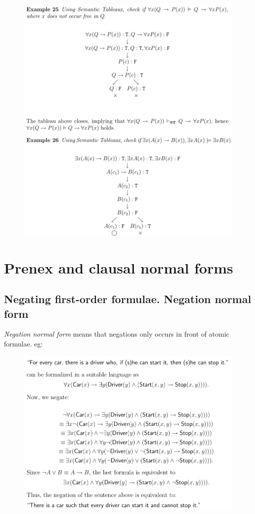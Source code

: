 \documentclass[10pt,a4paper]{article}
\begin{document}
\begin{figure}[H]
\includegraphics[scale=0.6]{./figures/tableaux.pdf}
\end{figure}

\section{Prenex and clausal normal forms}
\subsection{Negating first-order formulae. Negation normal form}

\textit{Negation normal form}\cite[p.58]{LecPartII} means that negations only occurs in front of atomic formulae. eg:

\begin{figure}[H]
\includegraphics[scale=0.6]{./figures/negnormform.pdf}
\end{figure}
\end{document}
